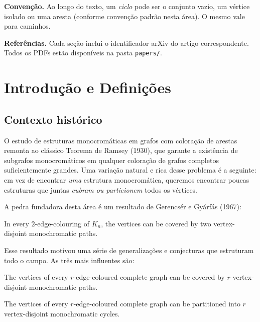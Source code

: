 \documentclass[12pt,a4paper,twoside,openright]{book}
\theoremstyle{definition}
\newcommand{\Kn}{K_n}
\begin{document}
\medskip
\noindent\textbf{Convenção.} Ao longo do texto, um \emph{ciclo} pode ser o conjunto vazio, um vértice isolado
ou uma aresta (conforme convenção padrão nesta área). O mesmo vale para caminhos.

\medskip
\noindent\textbf{Referências.} Cada seção inclui o identificador arXiv do artigo correspondente.
Todos os PDFs estão disponíveis na pasta \texttt{papers/}.


\mainmatter

\chapter{Introdução e Definições}


\section{Contexto histórico}

O estudo de estruturas monocromáticas em grafos com coloração de arestas remonta ao clássico Teorema de Ramsey
(1930), que garante a existência de subgrafos monocromáticos em qualquer coloração de grafos completos suficientemente grandes.
Uma variação natural e rica desse problema é a seguinte: em vez de encontrar \emph{uma} estrutura monocromática,
queremos encontrar poucas estruturas que juntas \emph{cubram ou particionem} todos os vértices.

A pedra fundadora desta área é um resultado de Gerencsér e Gyárfás (1967):


\begin{theorem}
In every $2$-edge-colouring of $\Kn$, the vertices can be covered by two vertex-disjoint monochromatic paths.
\end{theorem}


\noindent Esse resultado motivou uma série de generalizações e conjecturas que estruturam todo o campo.
As três mais influentes são:


\begin{conjecture}[Gyárfás, 1977]\label{conj:gyarfas-paths}
The vertices of every $r$-edge-coloured complete graph can be covered by $r$ vertex-disjoint monochromatic paths.
\end{conjecture}

\begin{conjecture}\label{conj:egp-cycles}
The vertices of every $r$-edge-coloured complete graph can be partitioned into $r$ vertex-disjoint monochromatic cycles.
\end{conjecture}
\end{document}
